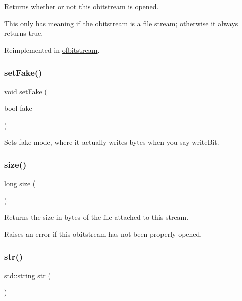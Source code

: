 Returns whether or not this obitstream is opened. 

This only has meaning if the obitstream is a file stream; otherwise it always returns true. 

Reimplemented in \mbox{\hyperlink{classofbitstream_a2f57f54d8c03b615bb31eee091d8a88a}{ofbitstream}}.

\mbox{\label{classobitstream_ad916b4624eb09d375514964f867b475c}} 
\subsubsection{\texorpdfstring{set\+Fake()}{setFake()}}
{\footnotesize\ttfamily void set\+Fake (\begin{DoxyParamCaption}\item[{bool}]{fake }\end{DoxyParamCaption})\hspace{0.3cm}{\ttfamily [inherited]}}



Sets \textquotesingle{}fake\textquotesingle{} mode, where it actually writes bytes when you say write\+Bit. 

\mbox{\label{classobitstream_a22727e9c338fb1aaa6722031445373c3}} 
\subsubsection{\texorpdfstring{size()}{size()}}
{\footnotesize\ttfamily long size (\begin{DoxyParamCaption}{ }\end{DoxyParamCaption})\hspace{0.3cm}{\ttfamily [inherited]}}



Returns the size in bytes of the file attached to this stream. 

Raises an error if this obitstream has not been properly opened. \mbox{\label{classostringbitstream_a615ccd723733653b9e6a2d72563f1cab}} 
\subsubsection{\texorpdfstring{str()}{str()}}
{\footnotesize\ttfamily std\+::string str (\begin{DoxyParamCaption}{ }\end{DoxyParamCaption})}



